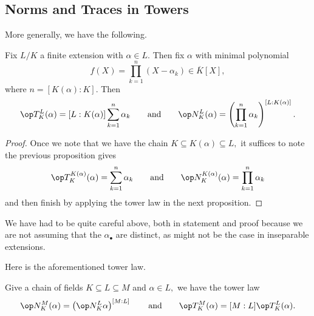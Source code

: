 \subsection{Norms and Traces in Towers}
More generally, we have the following.
\begin{proposition} \label{prop:computenormtrace}
	Fix $L/K$ a finite extension with $\alpha\in L.$ Then fix $\alpha$ with minimal polynomial
	\[f(X)=\prod_{k=1}^n(X-\alpha_k)\in\overline K[X],\]
	where $n=[K(\alpha):K].$ Then
	\[\op T^L_K(\alpha)=[L:K(\alpha)]\sum_{k=1}^n\alpha_k\qquad\text{and}\qquad\op N^L_K(\alpha)=\left(\prod_{k=1}^n\alpha_k\right)^{[L:K(\alpha)]}.\]
\end{proposition}
\begin{proof}
	Once we note that we have the chain $K\subseteq K(\alpha)\subseteq L,$ it suffices to note the previous proposition gives
	\[\op T^{K(\alpha)}_K(\alpha)=\sum_{k=1}^n\alpha_k\qquad\text{and}\qquad\op N^{K(\alpha)}_K(\alpha)=\prod_{k=1}^n\alpha_k\]
	and then finish by applying the tower law in the next proposition.
\end{proof}
\begin{remark}[Nir]
	We have had to be quite careful above, both in statement and proof because we are not assuming that the $\alpha_\bullet$ are distinct, as might not be the case in inseparable extensions.
\end{remark}
Here is the aforementioned tower law.
\begin{proposition} \label{prop:babytowerlaw}
	Give a chain of fields $K\subseteq L\subseteq M$ and $\alpha\in L,$ we have the tower law
	\[\op N^M_K(\alpha)=\left(\op N^L_K\alpha\right)^{[M:L]}\qquad\text{and}\qquad\op T^M_K(\alpha)=[M:L]\op T^L_K(\alpha).\]
\end{proposition}
